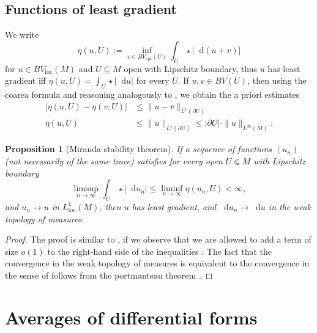 \documentclass[reqno,11pt]{amsart}
\newcommand*\dif{\mathop{}\!\mathrm{d}}
\newcommand{\loc}{\mathrm{loc}}
\newcommand{\cpt}{\mathrm{cpt}}
\newtheorem{proposition}[theorem]{Proposition}
\theoremstyle{definition}
\numberwithin{equation}{section}
\begin{document}
\subsection{Functions of least gradient}
We write
$$\eta(u, U) := \inf_{v \in BV_\cpt(U)} \int_U \star |\dif(u + v)|$$
for $u \in BV_\loc(M)$ and $U \subseteq M$ open with Lipschitz boundary, thus $u$ has least gradient iff $\eta(u, U) = \int_U \star |\dif u|$ for every $U$.
If $u, v \in BV(U)$, then using the coarea formula and reasoning analogously to \cite[Lemma 5.6]{Giusti77}, we obtain the a priori estimates
\begin{align}
|\eta(u, U) - \eta(v, U)| &\leq \|u - v\|_{L^1(\partial U)} \label{a priori estimate 1} \\
\eta(u, U) &\leq \|u\|_{L^1(\partial U)} \leq |\partial U| \cdot \|u\|_{L^\infty(M)}. \label{a priori estimate 2}
\end{align}

\begin{proposition}[Miranda stability theorem]\label{Miranda convergence}
If a sequence of functions $(u_n)$ (not necessarily of the same trace) satisfies for every open $U \Subset M$ with Lipschitz boundary
$$\limsup_{n \to \infty} \int_U \star |\dif u_n| \leq \liminf_{n \to \infty} \eta(u_n, U) < \infty,$$
and $u_n \to u$ in $L^1_\loc(M)$, then $u$ has least gradient, and $\dif u_n \to \dif u$ in the weak topology of measures.
\end{proposition}
\begin{proof}
The proof is similar to \cite[Teorema 3 and Osservazione 3]{Miranda67}, if we observe that we are allowed to add a term of size $o(1)$ to the right-hand side of the inequalities \cite[(2.8), (2.9), (2.13), and (2.14)]{Miranda67}.
The fact that the convergence in the weak topology of measures is equivalent to the convergence in the sense of \cite[Osservazione 3]{Miranda67} follows from the portmanteau theorem \cite[Theorem 13.16]{klenke2013probability}.
\end{proof}

\section{Averages of differential forms}\label{excess section}
\end{document}
